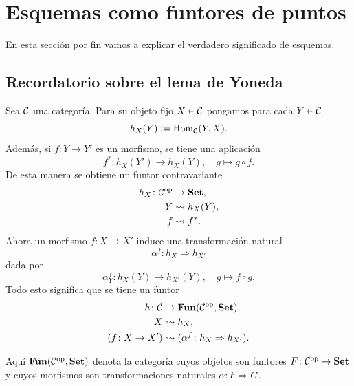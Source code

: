 \documentclass{article}
\numberwithin{equation}{section}
\theoremstyle{definition}
\begin{document}

\pagebreak
\section{Esquemas como funtores de puntos}
\label{sec:funtores-de-puntos}

En esta sección por fin vamos a explicar el verdadero significado de esquemas.


\subsection{Recordatorio sobre el lema de Yoneda}

\begin{definicion}
  \label{dfn:funtor-representable-contravariante}
  Sea $\mathcal{C}$ una categoría. Para su objeto fijo $X \in \mathcal{C}$
  pongamos para cada $Y \in \mathcal{C}$
  $$h_X (Y) \mathrel{\mathop:}= \operatorname{Hom}_\mathcal{C} (Y,X).$$
  Además, si $f\colon Y\to Y'$ es un morfismo, se tiene una aplicación
  $$f^*\colon h_X (Y') \to h_X (Y), \quad g \mapsto g\circ f.$$
  De esta manera se obtiene un funtor contravariante
  \begin{align*}
    h_X\colon \mathcal{C}^\mathrm{op} & \to \text{\bf Set},\\
    Y & \rightsquigarrow h_X (Y),\\
    f & \rightsquigarrow f^*.
  \end{align*}
  Ahora un morfismo $f\colon X\to X'$ induce una transformación natural
  $$\alpha^f\colon h_X \Rightarrow h_{X'}$$
  dada por
  $$\alpha^f_Y\colon h_X (Y) \to h_{X'} (Y), \quad g \mapsto f\circ g.$$
  Todo esto significa que se tiene un funtor
  \begin{align*}
    h\colon \mathcal{C} & \to \text{\bf Fun} (\mathcal{C}^\mathrm{op}, \text{\bf Set}),\\
    X & \rightsquigarrow h_X,\\
    (f\colon X\to X') & \rightsquigarrow (\alpha^f\colon h_X \Rightarrow h_{X'}).
  \end{align*}
\end{definicion}

Aquí $\text{\bf Fun} (\mathcal{C}^\mathrm{op}, \text{\bf Set})$ denota la categoría
cuyos objetos son funtores $F\colon \mathcal{C}^\mathrm{op} \to \text{\bf Set}$ y
cuyos morfismos son transformaciones naturales $\alpha\colon F\Rightarrow G$.
\end{document}
